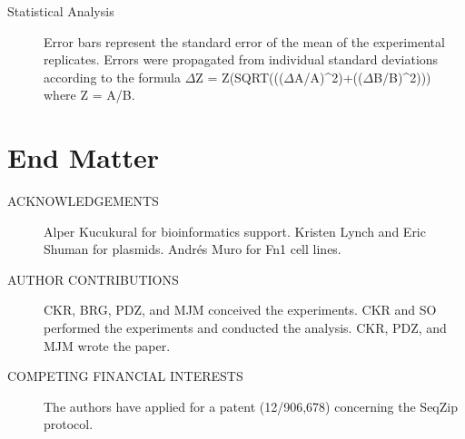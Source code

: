 \begin{description}
		\item[Statistical Analysis] 
		Error bars represent the standard error of the mean of the experimental replicates. Errors were propagated from individual standard deviations according to the formula $\Delta$Z = Z(SQRT((($\Delta$A/A)^2)+(($\Delta$B/B)^2))) where Z = A/B.

		\end{description}

\section{End Matter}
	\label{SeqZipPaper:sec:End Matter}

	\begin{description}

		\item[ACKNOWLEDGEMENTS] 
		Alper Kucukural for bioinformatics support. Kristen Lynch and Eric Shuman for plasmids. Andrés Muro for Fn1 cell lines. 

		\item[AUTHOR CONTRIBUTIONS] 
		CKR, BRG, PDZ, and MJM conceived the experiments. CKR and SO performed the experiments and conducted the analysis. CKR, PDZ, and MJM wrote the paper. 

		\item[COMPETING FINANCIAL INTERESTS] 
		The authors have applied for a patent (12/906,678) concerning the SeqZip protocol. 

		\end{description}

\cleardoublepage